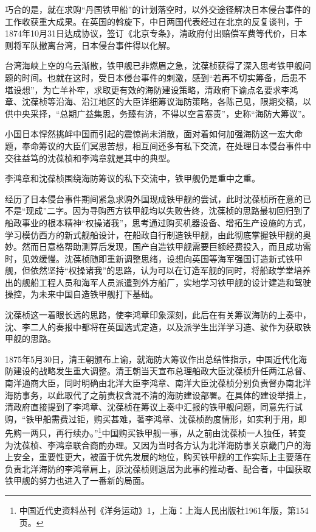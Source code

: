 \documentclass[12pt,UTF8]{ctexbook}
\begin{document}
巧合的是，就在求购“丹国铁甲船”的计划落空时，以外交途径解决日本侵台事件的工作收获重大成果。在英国的斡旋下，中日两国代表经过在北京的反复谈判，于1874年10月31日达成协议，签订《北京专条》，清政府付出赔偿军费等代价，日本则将军队撤离台湾，日本侵台事件得以化解。

台湾海峡上空的乌云渐散，铁甲舰已非燃眉之急，沈葆桢获得了深入思考铁甲舰问题的时间。也就在这时，受日本侵台事件的刺激，感到“若再不切实筹备，后患不堪设想”，为亡羊补牢，求取更有效的海防建设策略，清政府下谕点名要求李鸿章、沈葆桢等沿海、沿江地区的大臣详细筹议海防策略，各陈己见，限期交稿，以供中央采择，“总期广益集思，务臻有济，不得以空言塞责”，史称“海防大筹议”。

小国日本悍然挑衅中国而引起的震惊尚未消散，面对着如何加强海防这一宏大命题，奉命筹议的大臣们冥思苦想，相互间还多有私下交流，在处理日本侵台事件中交往益笃的沈葆桢和李鸿章就是其中的典型。

李鸿章和沈葆桢围绕海防筹议的私下交流中，铁甲舰仍是重中之重。

经历了日本侵台事件期间紧急求购外国现成铁甲舰的尝试，此时沈葆桢所在意的已不是“现成”二字。因为寻购西方铁甲舰均以失败告终，沈葆桢的思路最初回归到了船政事业的根本精神“权操诸我”，思考通过购买机器设备、增拓生产设施的方式，学习模仿西方的新式舰船设计，在船政自行制造铁甲舰，由此彻底掌握铁甲舰的奥妙。然而日意格帮助测算后发现，国产自造铁甲舰需要巨额经费投入，而且成功需时，见效缓慢。沈葆桢随即重新调整思绪，设想向英国等海军强国订造新式铁甲舰，但依然坚持“权操诸我”的思路，认为可以在订造军舰的同时，将船政学堂培养出的舰船工程人员和海军人员派遣到外方船厂，实地学习铁甲舰的设计建造和驾驶操控，为未来中国自造铁甲舰打下基础。

沈葆桢这一着眼长远的思路，使李鸿章印象深刻，此后在有关筹议海防的上奏中，沈、李二人的奏报中都将在英国选式定造，以及派学生出洋学习造、驶作为获取铁甲舰的思路。

1875年5月30日，清王朝颁布上谕，就海防大筹议作出总结性指示，中国近代化海防建设的战略发生重大调整。清王朝当天宣布总理船政大臣沈葆桢升任两江总督、南洋通商大臣，同时明确由北洋大臣李鸿章、南洋大臣沈葆桢分别负责督办南北洋海防事务，以此取代了之前责权含混不清的海防建设部署。在具体的建设举措上，清政府直接提到了李鸿章、沈葆桢在筹议上奏中汇报的铁甲舰问题，同意先行试购，“铁甲船需费过钜，购买甚难，著李鸿章、沈葆桢酌度情形，如实利于用，即先购一两只，再行续办。”\footnote{中国近代史资料丛刊《洋务运动》1，上海：上海人民出版社1961年版，第154页。}中国购买铁甲舰一事，从之前由沈葆桢一人独任，转变为沈葆桢、李鸿章联合商酌办理。又因为当时各方认为北洋海防事关京畿门户的海上安全，重要性更大，被置于优先发展的地位，购买铁甲舰的工作实际上主要落在负责北洋海防的李鸿章肩上，原沈葆桢则退居为此事的推动者、配合者，中国获取铁甲舰的努力也进入了一番新的局面。
\end{document}
